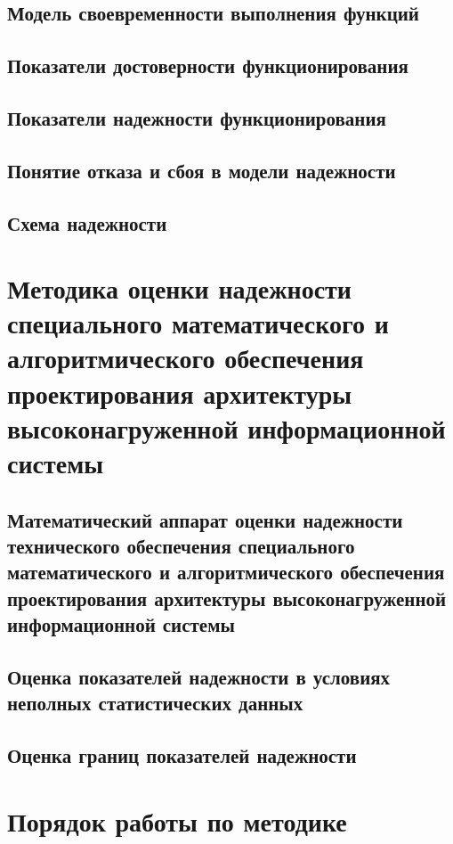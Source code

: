\subsection{Модель своевременности выполнения функций}\label{subsec:ch3/sect2/sub2}
\subsection{Показатели достоверности функционирования}\label{subsec:ch3/sect2/sub3}
\subsection{Показатели надежности функционирования}\label{subsec:ch3/sect2/sub4}
\subsection{Понятие отказа и сбоя в модели надежности}\label{subsec:ch3/sect2/sub5}
\subsection{Схема надежности}\label{subsec:ch3/sect2/sub6}

\section{Методика оценки надежности специального математического и алгоритмического обеспечения проектирования архитектуры высоконагруженной информационной системы}\label{sec:ch3/sect3}
\subsection{Математический аппарат оценки надежности технического обеспечения специального математического и алгоритмического обеспечения проектирования архитектуры высоконагруженной информационной системы}\label{subsec:ch3/sect3/sub1}
\subsection{Оценка показателей надежности в условиях неполных статистических данных}\label{sec:ch3/sect3/sub2}
\subsection{Оценка границ показателей надежности}\label{sec:ch3/sect3/sub3}
\section{Порядок работы по методике}\label{sec:ch3/sect4}

